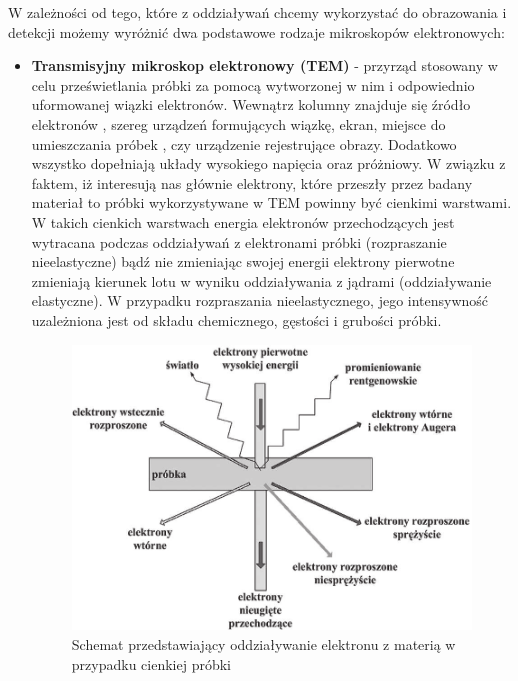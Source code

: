 \documentclass{article}
\begin{document}
\begin{enumerate}
W zależności od tego, które z oddziaływań chcemy wykorzystać do obrazowania i detekcji możemy wyróżnić dwa podstawowe rodzaje mikroskopów elektronowych:
\begin{itemize}
\item {\bf Transmisyjny mikroskop elektronowy (TEM)} - przyrząd stosowany w celu prześwietlania próbki za pomocą wytworzonej w nim i odpowiednio uformowanej wiązki elektronów.  Wewnątrz kolumny znajduje się źródło elektronów , szereg urządzeń formujących wiązkę, ekran, miejsce do umieszczania próbek , czy urządzenie rejestrujące obrazy. Dodatkowo wszystko dopełniają układy wysokiego napięcia oraz próżniowy. W związku z faktem, iż interesują nas głównie elektrony, które przeszły przez badany materiał to próbki wykorzystywane w TEM powinny być cienkimi warstwami. W takich cienkich warstwach energia elektronów przechodzących jest wytracana podczas oddziaływań z elektronami próbki (rozpraszanie nieelastyczne) bądź nie zmieniając swojej energii elektrony pierwotne zmieniają kierunek lotu w wyniku oddziaływania z jądrami (oddziaływanie elastyczne). W przypadku rozpraszania nieelastycznego, jego intensywność uzależniona jest od składu chemicznego, gęstości i grubości próbki. 

\begin{figure}[h!]
\centering
\includegraphics[scale=0.3]{oddzialywanie.png}
\caption{Schemat przedstawiający oddziaływanie elektronu z materią w przypadku cienkiej próbki}
\end{figure}


\end{itemize}
\end{enumerate}
\end{document}
